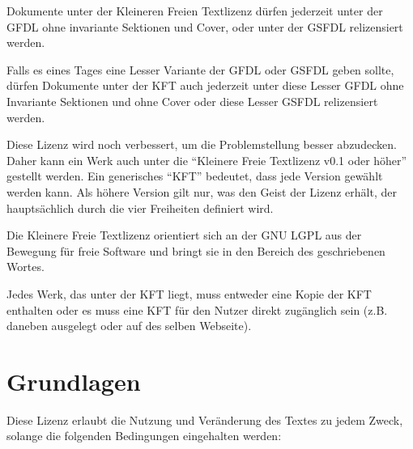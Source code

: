 \documentclass[a4paper,10pt]{scrartcl}
\begin{document}
Dokumente unter der Kleineren Freien Textlizenz dürfen jederzeit unter der GFDL ohne invariante Sektionen und Cover, oder unter der GSFDL relizensiert werden. 

Falls es eines Tages eine Lesser Variante der GFDL oder GSFDL geben sollte, dürfen Dokumente unter der KFT auch jederzeit unter diese Lesser GFDL ohne Invariante Sektionen und ohne Cover oder diese Lesser GSFDL relizensiert werden. 

Diese Lizenz wird noch verbessert, um die Problemstellung besser abzudecken. Daher kann ein Werk auch unter die "`Kleinere Freie Textlizenz v0.1 oder höher"' gestellt werden. Ein generisches "`KFT"' bedeutet, dass jede Version gewählt werden kann. Als höhere Version gilt nur, was den Geist der Lizenz erhält, der hauptsächlich durch die vier Freiheiten definiert wird. 

Die Kleinere Freie Textlizenz orientiert sich an der GNU LGPL aus der Bewegung für freie Software und bringt sie in den Bereich des geschriebenen Wortes. 

Jedes Werk, das unter der KFT liegt, muss entweder eine Kopie der KFT enthalten oder es muss eine KFT für den Nutzer direkt zugänglich sein (z.B. daneben ausgelegt oder auf des selben Webseite). 

\section{Grundlagen}

Diese Lizenz erlaubt die Nutzung und Veränderung des Textes zu jedem Zweck, solange die folgenden Bedingungen eingehalten werden: 
\end{document}

